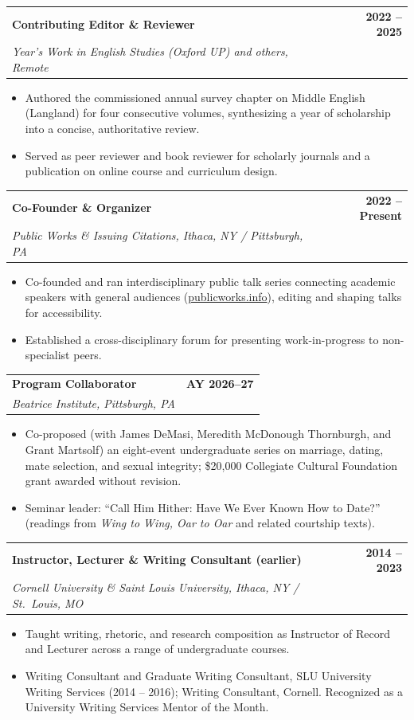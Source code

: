 \documentclass[11pt,letterpaper]{article}
\makeatletter
\newcommand{\entry}[4]{%
  \noindent\begin{tabularx}{\linewidth}{@{}X r@{}}
    \textbf{#1} & \textbf{#4}\\
    \textit{#2, #3} & \\
  \end{tabularx}\vspace{1pt}}
\makeatother
\begin{document}
\entry{Contributing Editor \& Reviewer}{Year's Work in English Studies (Oxford UP) and others}{Remote}{2022 -- 2025}
\begin{itemize}
  \item Authored the commissioned annual survey chapter on Middle English (Langland) for four consecutive volumes, synthesizing a year of scholarship into a concise, authoritative review.
  \item Served as peer reviewer and book reviewer for scholarly journals and a publication on online course and curriculum design.
\end{itemize}
\vspace{5pt}

\entry{Co-Founder \& Organizer}{Public Works \& Issuing Citations}{Ithaca, NY / Pittsburgh, PA}{2022 -- Present}
\begin{itemize}
  \item Co-founded and ran interdisciplinary public talk series connecting academic speakers with general audiences (\href{https://www.publicworks.info}{publicworks.info}), editing and shaping talks for accessibility.
  \item Established a cross-disciplinary forum for presenting work-in-progress to non-specialist peers.
\end{itemize}
\vspace{5pt}

\entry{Program Collaborator}{Beatrice Institute}{Pittsburgh, PA}{AY 2026--27}
\begin{itemize}
  \item Co-proposed (with James DeMasi, Meredith McDonough Thornburgh, and Grant Martsolf) an eight-event undergraduate series on marriage, dating, mate selection, and sexual integrity; \$20{,}000 Collegiate Cultural Foundation grant awarded without revision.
  \item Seminar leader: ``Call Him Hither: Have We Ever Known How to Date?'' (readings from \textit{Wing to Wing, Oar to Oar} and related courtship texts).
\end{itemize}
\vspace{5pt}

\entry{Instructor, Lecturer \& Writing Consultant (earlier)}{Cornell University \& Saint Louis University}{Ithaca, NY / St.\ Louis, MO}{2014 -- 2023}
\begin{itemize}
  \item Taught writing, rhetoric, and research composition as Instructor of Record and Lecturer across a range of undergraduate courses.
  \item Writing Consultant and Graduate Writing Consultant, SLU University Writing Services (2014 -- 2016); Writing Consultant, Cornell. Recognized as a University Writing Services Mentor of the Month.
\end{itemize}
\end{document}
